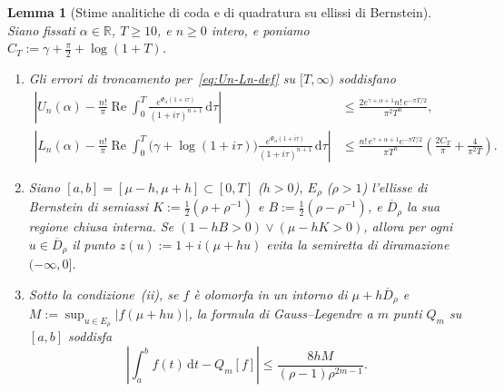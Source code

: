 \documentclass[11pt, reqno]{amsart}
\newtheorem{lemma}{Lemma}[section]
\theoremstyle{remark}
\numberwithin{equation}{section}
\DeclareMathOperator{\re}{Re}
\newcommand{\R}{\mathbb{R}}
\newcommand{\dd}{\,\mathrm{d}}
\begin{document}
\begin{lemma}[Stime analitiche di coda e di quadratura su ellissi di Bernstein]\label{lem:arb-bounds}
Siano fissati $\alpha \in \R$, $T \ge 10$, e $n \ge 0$ intero, e poniamo $C_T := \gamma + \frac{\pi}{2} + \log(1+T)$.
\begin{enumerate}
\item[(i)] Gli errori di troncamento per~\eqref{eq:Un-Ln-def} su $[T,\infty)$ soddisfano
\begin{align}
\left| U_n(\alpha) - \frac{n!}{\pi}\re \int_0^T \frac{e^{\Phi_\alpha(1+i\tau)}}{(1+i\tau)^{n+1}}\dd\tau \right|
&\le \frac{2 e^{\gamma+\alpha+1} n!\, e^{-\pi T/2}}{\pi^2 T^n}, \label{eq:Un-tail}\\
\left| L_n(\alpha) - \frac{n!}{\pi}\re \int_0^T \bigl(\gamma+\log(1+i\tau)\bigr)
\frac{e^{\Phi_\alpha(1+i\tau)}}{(1+i\tau)^{n+1}}\dd\tau \right|
&\le \frac{n!\, e^{\gamma+\alpha+1} e^{-\pi T/2}}{\pi T^n}\left(\frac{2 C_T}{\pi} + \frac{4}{\pi^2 T}\right). \label{eq:Ln-tail}
\end{align}
\item[(ii)] Siano $[a,b] = [\mu - h, \mu + h] \subset [0, T]$ ($h > 0$), $E_\rho$ ($\rho > 1$) l'ellisse di
Bernstein di semiassi $K := \frac{1}{2}(\rho+\rho^{-1})$ e $B := \frac{1}{2}(\rho-\rho^{-1})$, e
$\overline{D}_\rho$ la sua regione chiusa interna. Se $(1 - h B > 0) \lor (\mu - h K > 0)$, allora per ogni
$u \in \overline{D}_\rho$ il punto $z(u) := 1 + i(\mu + h u)$ evita la semiretta di diramazione $(-\infty, 0]$.
\item[(iii)] Sotto la condizione~(ii), se $f$ è olomorfa in un intorno di $\mu + h\overline{D}_\rho$ e
$M := \sup_{u \in E_\rho} |f(\mu + h u)|$, la formula di Gauss--Legendre a $m$ punti $Q_m$ su $[a,b]$ soddisfa
\begin{equation}\label{eq:GL-bernstein-err}
\left|\int_a^b f(t)\dd t - Q_m[f]\right| \le \frac{8 h M}{(\rho - 1)\rho^{2m-1}}.
\end{equation}
\end{enumerate}
\end{lemma}
\end{document}
